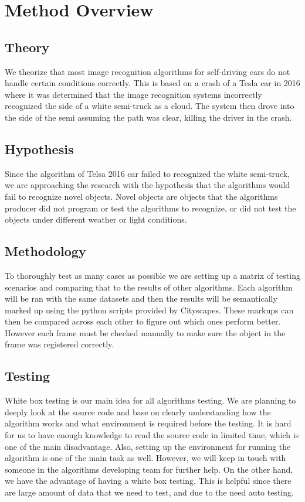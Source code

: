 \documentclass[10pt,draftclsnofoot,onecolumn,journal,compsoc]{IEEEtran}
\begin{document}
\section{Method Overview}

\subsection{Theory}
We theorize that most image recognition algorithms for self-driving cars do not handle certain conditions correctly.
This is based on a crash of a Tesla car in 2016 where it was determined that the image recognition systems incorrectly recognized the side of a white semi-truck as a cloud.
The system then drove into the side of the semi assuming the path was clear, killing the driver in the crash.

\subsection{Hypothesis}
Since the algorithm of Telsa 2016 car failed to recognized the white semi-truck, we are approaching the research with the hypothesis that the algorithms would fail to recognize novel objects. Novel objects are objects that the algorithms producer did not program or test the algorithms to recognize, or did not test the objects under different weather or light conditions. 


\subsection{Methodology}	
To thoroughly test as many cases as possible we are setting up a matrix of testing scenarios and comparing that to the results of other algorithms. 
Each algorithm will be ran with the same datasets and then the results will be semantically marked up using the python scripts provided by Cityscapes. 
These markups can then be compared across each other to figure out which ones perform better.
However each frame must be checked manually to make sure the object in the frame was registered correctly. 

\subsection{Testing}
White box testing is our main idea for all algorithms testing. 
We are planning to deeply look at the source code and base on clearly understanding how the algorithm works and what environment is required before the testing. 
It is hard for us to have enough knowledge to read the source code in limited time, which is one of the main disadvantage.
Also, setting up the environment for running the algorithm is one of the main task as well.
However, we will keep in touch with someone in the algorithms developing team for further help. 
On the other hand, we have the advantage of having a white box testing. 
This is helpful since there are large amount of data that we need to test, and due to the need auto testing. 
\end{document}
